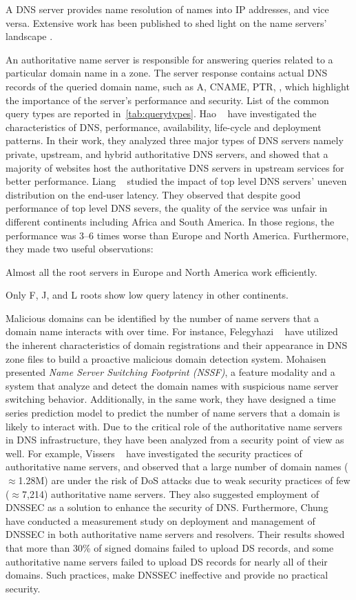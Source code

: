 A DNS server provides name resolution of names into IP addresses, and vice versa. Extensive work has been published to shed light on the name servers' landscape .

An authoritative name server is responsible for answering queries related to a particular domain name in a zone. The server response contains actual DNS records of the queried domain name, such as A, CNAME, PTR, \etc, which highlight the importance of the server's performance and security. List of the common query types are reported in~\autoref{tab:querytypes}. 
Hao \etal~ have investigated the characteristics of DNS, \eg performance, availability, life-cycle and deployment patterns. In their work, they analyzed three major types of DNS servers namely private, upstream, and hybrid authoritative DNS servers, and showed that a majority of websites host the authoritative DNS servers in upstream services for better performance. 
Liang \etal~ studied the impact of top level DNS servers' uneven distribution on the end-user latency. They observed that despite good performance of top level DNS severs, the quality of the service was unfair in different continents including  Africa and South America. In those regions, the performance was 3--6 times worse than Europe and North America. Furthermore, they made two useful observations:
\begin{enumerate*}
    \item Almost all the root servers in Europe and North America work efficiently. 
    \item Only F, J, and L roots show low query latency in other continents. 
\end{enumerate*}
Malicious domains can be identified by the number of name servers that a domain name interacts with over time. For instance, Felegyhazi \etal~ have utilized the inherent characteristics of domain registrations and their appearance in DNS zone files to build a proactive malicious domain detection system. Mohaisen \etal~ presented \textit{Name Server Switching Footprint (NSSF)}, a feature modality and a system that analyze and detect the domain names with suspicious name server switching behavior. Additionally, in the same work, they have designed a time series prediction model to predict the number of name servers that a domain is likely to interact with.  
Due to the critical role of the authoritative name servers in DNS infrastructure, they have been analyzed from a security point of view as well. For example, Vissers \etal~ have investigated the security practices of authoritative name servers, and observed that a large number of domain names ($\approx$1.28M) are under the risk of DoS attacks due to weak security practices of few ($\approx$7,214) authoritative name servers. They also suggested employment of DNSSEC as a solution to enhance the security of DNS. Furthermore, Chung \etal~ have conducted a measurement study on deployment and management of DNSSEC in both authoritative name servers and resolvers. Their results showed that more than 30\% of signed domains failed to upload DS records, and some authoritative name servers failed to upload DS records for nearly all of their domains.  Such practices, make DNSSEC ineffective and provide no practical security.

